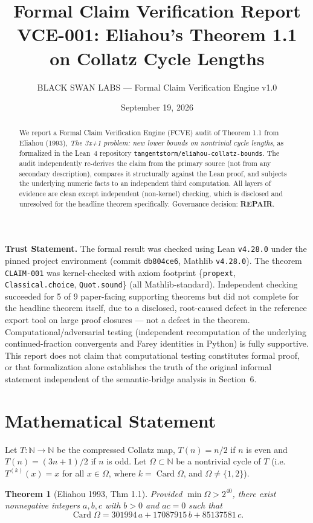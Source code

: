 \documentclass[11pt]{article}
\title{Formal Claim Verification Report\\[4pt]\large VCE-001: Eliahou's Theorem 1.1 on Collatz Cycle Lengths}
\author{BLACK SWAN LABS --- Formal Claim Verification Engine v1.0}
\date{September 19, 2026}
\newtheorem{theorem}{Theorem}
\begin{document}
\maketitle

\noindent\textbf{Trust Statement.} The formal result was checked using Lean \texttt{v4.28.0} under the pinned project environment (commit \texttt{db804ce6}, Mathlib \texttt{v4.28.0}). The theorem \texttt{CLAIM-001} was kernel-checked with axiom footprint \{\texttt{propext}, \texttt{Classical.choice}, \texttt{Quot.sound}\} (all Mathlib-standard). Independent checking succeeded for 5 of 9 paper-facing supporting theorems but did not complete for the headline theorem itself, due to a disclosed, root-caused defect in the reference export tool on large proof closures --- not a defect in the theorem. Computational/adversarial testing (independent recomputation of the underlying continued-fraction convergents and Farey identities in Python) is fully supportive. This report does not claim that computational testing constitutes formal proof, or that formalization alone establishes the truth of the original informal statement independent of the semantic-bridge analysis in Section~6.

\begin{abstract}
We report a Formal Claim Verification Engine (FCVE) audit of Theorem 1.1 from Eliahou (1993), \emph{The 3x+1 problem: new lower bounds on nontrivial cycle lengths}, as formalized in the Lean~4 repository \texttt{tangentstorm/eliahou-collatz-bounds}. The audit independently re-derives the claim from the primary source (not from any secondary description), compares it structurally against the Lean proof, and subjects the underlying numeric facts to an independent third computation. All layers of evidence are clean except independent (non-kernel) checking, which is disclosed and unresolved for the headline theorem specifically. Governance decision: \textbf{REPAIR}.
\end{abstract}

\section{Mathematical Statement}
Let $T:\mathbb{N}\to\mathbb{N}$ be the compressed Collatz map, $T(n) = n/2$ if $n$ is even and $T(n)=(3n+1)/2$ if $n$ is odd. Let $\Omega\subset\mathbb{N}$ be a nontrivial cycle of $T$ (i.e.\ $T^{(k)}(x)=x$ for all $x\in\Omega$, where $k=\operatorname{Card}\Omega$, and $\Omega\neq\{1,2\}$).

\begin{theorem}[Eliahou 1993, Thm 1.1]
Provided $\min\Omega > 2^{40}$, there exist nonnegative integers $a,b,c$ with $b>0$ and $ac=0$ such that
\[
\operatorname{Card}\Omega = 301994\,a + 17087915\,b + 85137581\,c.
\]
\end{theorem}
\end{document}
